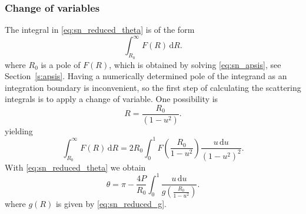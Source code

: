 %
\subsubsection{Change of variables}
%
The integral in \cref{eq:sn_reduced_theta} is of the form
%
\begin{equation}
    \label{eq:sn_legacy_integration_integral_R}
    \int_{R_0}^\infty F(R) \, \mathrm{d}R .
\end{equation}
%
where \(R_0\) is a pole of $F(R)$, which is obtained by solving \cref{eq:sn_apsis}, see Section~\ref{s:apsis}.
Having a numerically determined pole of the integrand as an integration boundary is inconvenient, so the first step of calculating the scattering integrals is to apply a change of variable.
One possibility is \cite{Eck91}
%
\begin{equation}
    \label{eq:sn_legacy_transform1}
    R = \frac{ R_0 }{ (1-u^2) } .
\end{equation}
%
yielding
%
\begin{equation}
    \label{eq:sn_legacy_integration_integral_u1}
    \int_{R_0}^\infty F(R) \, \mathrm{d}R =
        2 R_0 \int_0^1 F \left( \frac{ R_0 }{ 1-u^2 } \right)
        \frac{ u \, \mathrm{d}u }{ (1-u^2)^2 } .
\end{equation}
%
With \cref{eq:sn_reduced_theta} we obtain
%
\begin{equation}
    \label{eq:sn_legacy_cmangl_legendre_theta_u}
    \theta = \pi - \frac{ 4 P }{ R_0 } \int_0^1
        \frac{ u \, \mathrm{d}u }{ g \left( \frac{ R_0 }{ 1-u^2 } \right) } .
\end{equation}
%
where $g(R)$ is given by \cref{eq:sn_reduced_g}.

